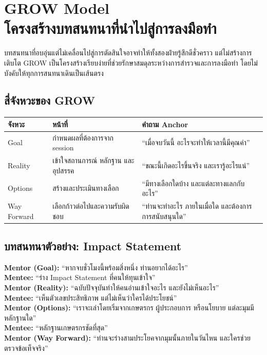 \chapter{GROW Model\\โครงสร้างบทสนทนาที่นำไปสู่การลงมือทำ}

บทสนทนาที่อบอุ่นแต่ไม่เคลื่อนไปสู่การตัดสินใจอาจทำให้ทั้งสองฝ่ายรู้สึกดีชั่วคราว แต่ไม่สร้างการเติบโต GROW เป็นโครงสร้างเรียบง่ายที่ช่วยรักษาสมดุลระหว่างการสำรวจและการลงมือทำ โดยไม่บังคับให้ทุกการสนทนาเดินเป็นเส้นตรง


\section{สี่จังหวะของ GROW}
\begin{longtable}{P{.15\textwidth}P{.27\textwidth}P{.44\textwidth}}
\toprule
\textbf{จังหวะ} & \textbf{หน้าที่} & \textbf{คำถาม Anchor}\\
\midrule
Goal & กำหนดผลที่ต้องการจาก session & \enquote{เมื่อจบวันนี้ อะไรจะทำให้เวลานี้มีคุณค่า}\\
Reality & เข้าใจสถานการณ์ หลักฐาน และอุปสรรค & \enquote{ขณะนี้เกิดอะไรขึ้นจริง และเรารู้อะไรแน่}\\
Options & สร้างและประเมินทางเลือก & \enquote{มีทางเลือกใดบ้าง และแต่ละทางแลกกับอะไร}\\
Way Forward & เลือกก้าวต่อไปและความรับผิดชอบ & \enquote{ท่านจะทำอะไร ภายในเมื่อใด และต้องการการสนับสนุนใด}\\
\bottomrule
\end{longtable}

\section{บทสนทนาตัวอย่าง: Impact Statement}
\begin{examplebox}
\textbf{Mentor (Goal):} \enquote{หากจบชั่วโมงนี้พร้อมสิ่งหนึ่ง ท่านอยากได้อะไร}\\
\textbf{Mentee:} \enquote{ร่าง Impact Statement ที่คนให้ทุนเข้าใจ}\\
\textbf{Mentor (Reality):} \enquote{ฉบับปัจจุบันทำให้คนอ่านเข้าใจอะไร และยังไม่เห็นอะไร}\\
\textbf{Mentee:} \enquote{เห็นตัวเลขประสิทธิภาพ แต่ไม่เห็นว่าใครได้ประโยชน์}\\
\textbf{Mentor (Options):} \enquote{เราจะเล่าโดยเริ่มจากเกษตรกร ผู้ประกอบการ หรือนโยบาย แต่ละมุมมีหลักฐานใด}\\
\textbf{Mentee:} \enquote{หลักฐานเกษตรกรชัดที่สุด}\\
\textbf{Mentor (Way Forward):} \enquote{ท่านจะร่างสามประโยคจากมุมนั้นภายในวันไหน และใครช่วยตรวจข้อเท็จจริง}\\
\end{examplebox}

